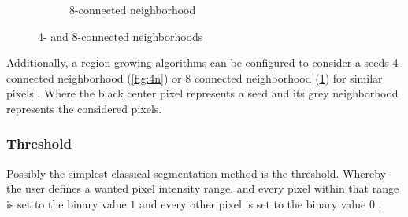 \begin{figure}[h!]
\begin{subfigure}{0.49\textwidth}
{}
		\caption{8-connected neighborhood}\label{fig:8n}
	\end{subfigure}
	\caption{4- and 8-connected neighborhoods}\label{fig:neighborhoods}
\end{figure}

\noindent
Additionally, a region growing algorithms can be configured to consider a seeds 4-connected neighborhood
(\cref{fig:4n}) or 8 connected neighborhood (\cref{fig:8n}) for similar pixels \cite{jourlinVariousContrastConcepts2016,palReviewImageSegmentation1993}.
Where the black center pixel represents a seed and its grey neighborhood represents the considered pixels.


\subsubsection{Threshold}
Possibly the simplest classical segmentation method is the threshold.
Whereby the user defines a wanted pixel intensity range, and every pixel within that range is set to the binary value $1$
and every other pixel is set to the binary value $0$ \cite{sankurSurveyImageThresholding2004}.

